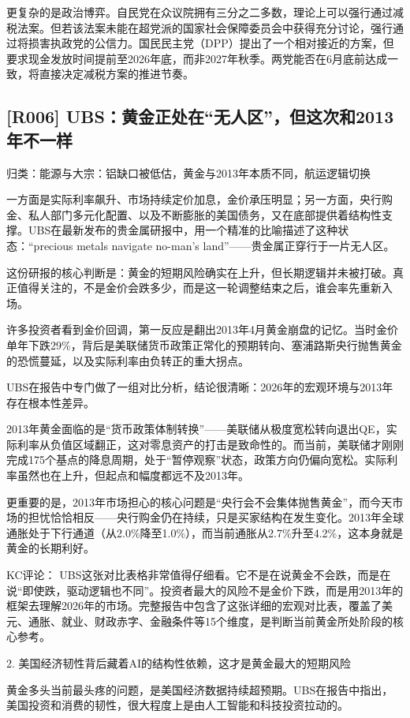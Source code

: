 \documentclass[11pt]{ctexart}
\begin{document}
更复杂的是政治博弈。自民党在众议院拥有三分之二多数，理论上可以强行通过减税法案。但若该法案未能在超党派的国家社会保障委员会中获得充分讨论，强行通过将损害执政党的公信力。国民民主党（DPP）提出了一个相对接近的方案，但要求现金发放时间提前至2026年底，而非2027年秋季。两党能否在6月底前达成一致，将直接决定减税方案的推进节奏。

\subsection{[R006] UBS：黄金正处在“无人区”，但这次和2013年不一样}
{\small\color{refgray}归类：能源与大宗：铝缺口被低估，黄金与2013年本质不同，航运逻辑切换}

一方面是实际利率飙升、市场持续定价加息，金价承压明显；另一方面，央行购金、私人部门多元化配置、以及不断膨胀的美国债务，又在底部提供着结构性支撑。UBS在最新发布的贵金属研报中，用一个精准的比喻描述了这种状态：“precious metals navigate no-man's land”——贵金属正穿行于一片无人区。

这份研报的核心判断是：黄金的短期风险确实在上升，但长期逻辑并未被打破。真正值得关注的，不是金价会跌多少，而是这一轮调整结束之后，谁会率先重新入场。

许多投资者看到金价回调，第一反应是翻出2013年4月黄金崩盘的记忆。当时金价单年下跌29\%，背后是美联储货币政策正常化的预期转向、塞浦路斯央行抛售黄金的恐慌蔓延，以及实际利率由负转正的重大拐点。

UBS在报告中专门做了一组对比分析，结论很清晰：2026年的宏观环境与2013年存在根本性差异。

2013年黄金面临的是“货币政策体制转换”——美联储从极度宽松转向退出QE，实际利率从负值区域翻正，这对零息资产的打击是致命性的。而当前，美联储才刚刚完成175个基点的降息周期，处于“暂停观察”状态，政策方向仍偏向宽松。实际利率虽然也在上升，但起点和幅度都远不及2013年。

更重要的是，2013年市场担心的核心问题是“央行会不会集体抛售黄金”，而今天市场的担忧恰恰相反——央行购金仍在持续，只是买家结构在发生变化。2013年全球通胀处于下行通道（从2.0\%降至1.0\%），而当前通胀从2.7\%升至4.2\%，这本身就是黄金的长期利好。

KC评论： UBS这张对比表格非常值得仔细看。它不是在说黄金不会跌，而是在说“即使跌，驱动逻辑也不同”。投资者最大的风险不是金价下跌，而是用2013年的框架去理解2026年的市场。完整报告中包含了这张详细的宏观对比表，覆盖了美元、通胀、就业、财政赤字、金融条件等15个维度，是判断当前黄金所处阶段的核心参考。

2. 美国经济韧性背后藏着AI的结构性依赖，这才是黄金最大的短期风险

黄金多头当前最头疼的问题，是美国经济数据持续超预期。UBS在报告中指出，美国投资和消费的韧性，很大程度上是由人工智能和科技投资拉动的。
\end{document}
